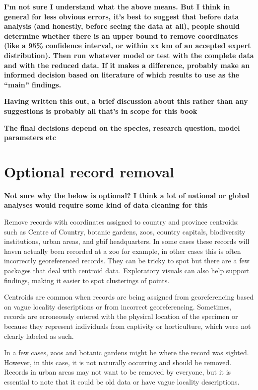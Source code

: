 \documentclass[
  letterpaper,
  DIV=11,
  numbers=noendperiod,
  oneside]{scrreprt}
\begin{document}
\textbf{I'm not sure I understand what the above means. But I think in
general for less obvious errors, it's best to suggest that before data
analysis (and honestly, before seeing the data at all), people should
determine whether there is an upper bound to remove coordinates (like a
95\% confidence interval, or within xx km of an accepted expert
distribution). Then run whatever model or test with the complete data
and with the reduced data. If it makes a difference, probably make an
informed decision based on literature of which results to use as the
``main'' findings.}

\textbf{Having written this out, a brief discussion about this rather
than any suggestions is probably all that's in scope for this book}

\textbf{The final decisions depend on the species, research question,
model parameters etc}

\hypertarget{optional-record-removal}{%
\section{Optional record removal}\label{optional-record-removal}}

\textbf{Not sure why the below is optional? I think a lot of national or
global analyses would require some kind of data cleaning for this}

Remove records with coordinates assigned to country and province
centroids: such as Centre of Country, botanic gardens, zoos, country
capitals, biodiversity institutions, urban areas, and gbif headquarters.
In some cases these records will haven actually been recorded at a zoo
for example, in other cases this is often incorrectly georeferenced
records. They can be tricky to spot but there are a few packages that
deal with centroid data. Exploratory visuals can also help support
findings, making it easier to spot clusterings of points.

Centroids are common when records are being assigned from georeferencing
based on vague locality descriptions or from incorrect georeferencing.
Sometimes, records are erroneously entered with the physical location of
the specimen or because they represent individuals from captivity or
horticulture, which were not clearly labeled as such.

In a few cases, zoos and botanic gardens might be where the record was
sighted. However, in this case, it is not naturally occurring and should
be removed. Records in urban areas may not want to be removed by
everyone, but it is essential to note that it could be old data or have
vague locality descriptions.
\end{document}
